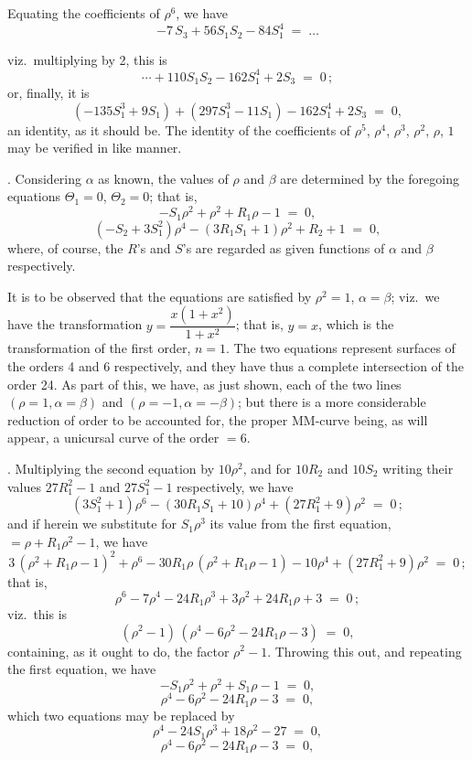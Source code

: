 \documentclass[11pt]{article}
\begin{document}
\medskip

\noindent Equating the coefficients of $\rho^6$, we have
\[
-7\,S_3 + 56 S_1 S_2 - 84 S_1^4 \;=\;\ldots
\]

\newpage

\noindent viz.\ multiplying by 2, this is
\[
\cdots + 110 S_1 S_2 - 162 S_1^4 + 2 S_3 \;=\; 0\,;
\]
or, finally, it is
\[
(-135 S_1^3 + 9 S_1) + (297 S_1^3 - 11 S_1) - 162 S_1^4 + 2 S_3 \;=\; 0,
\]
an identity, as it should be. The identity of the coefficients of $\rho^5$, $\rho^4$, $\rho^3$, $\rho^2$, $\rho$, $1$ may be verified in like manner.

\medskip

. Considering $\alpha$ as known, the values of $\rho$ and $\beta$ are determined by the foregoing equations $\Theta_1 = 0$, $\Theta_2 = 0$; that is,
\[
-S_1\rho^2 + \rho^2 + R_1\rho - 1 \;=\; 0,
\]
\[
(-S_2 + 3 S_1^2)\rho^4 - (3 R_1 S_1 + 1)\rho^2 + R_2 + 1 \;=\; 0,
\]
where, of course, the $R$'s and $S$'s are regarded as given functions of $\alpha$ and $\beta$ respectively.

\medskip

\noindent It is to be observed that the equations are satisfied by $\rho^2 = 1$, $\alpha = \beta$; viz.\ we have the transformation $y = \dfrac{x(1+x^2)}{1+x^2}$; that is, $y = x$, which is the transformation of the first order, $n = 1$. The two equations represent surfaces of the orders 4 and 6 respectively, and they have thus a complete intersection of the order 24. As part of this, we have, as just shown, each of the two lines $(\rho = 1, \alpha = \beta)$ and $(\rho = -1, \alpha = -\beta)$; but there is a more considerable reduction of order to be accounted for, the proper MM-curve being, as will appear, a unicursal curve of the order $= 6$.

\medskip

. Multiplying the second equation by $10\rho^2$, and for $10 R_2$ and $10 S_2$ writing their values $27 R_1^2 - 1$ and $27 S_1^2 - 1$ respectively, we have
\[
(3 S_1^2 + 1)\rho^6 - (30 R_1 S_1 + 10)\rho^4 + (27 R_1^2 + 9)\rho^2 \;=\; 0\,;
\]
and if herein we substitute for $S_1\rho^3$ its value from the first equation, $= \rho + R_1\rho^2 - 1$, we have
\[
3\,(\rho^2 + R_1\rho - 1)^2 + \rho^6 - 30 R_1\rho\,(\rho^2 + R_1\rho - 1) - 10\rho^4 + (27 R_1^2 + 9)\rho^2 \;=\; 0\,;
\]
that is,
\[
\rho^6 - 7\rho^4 - 24 R_1\rho^3 + 3\rho^2 + 24 R_1\rho + 3 \;=\; 0\,;
\]
viz.\ this is
\[
(\rho^2 - 1)\,(\rho^4 - 6\rho^2 - 24 R_1\rho - 3) \;=\; 0,
\]
containing, as it ought to do, the factor $\rho^2 - 1$. Throwing this out, and repeating the first equation, we have
\[
-S_1\rho^2 + \rho^2 + S_1\rho - 1 \;=\; 0,
\]
\[
\rho^4 - 6\rho^2 - 24 R_1\rho - 3 \;=\; 0,
\]
which two equations may be replaced by
\[
\rho^4 - 24 S_1\rho^3 + 18\rho^2 - 27 \;=\; 0,
\]
\[
\rho^4 - 6\rho^2 - 24 R_1\rho - 3 \;=\; 0,
\]
\end{document}

